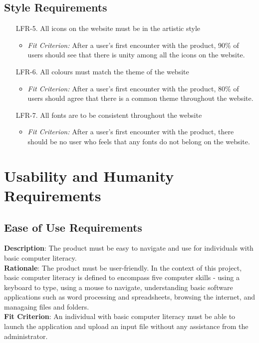 \documentclass[12pt]{article}
\begin{document}
\subsection{Style Requirements}
\begin{enumerate}
  \item [LFR-5.] All icons on the website must be in the artistic style
  \begin{itemize}
    \item \textit{Fit Criterion:} After a user's first encounter with the product, 90\% of users should
    see that there is unity among all the icons on the website. 
  \end{itemize}
  \item [LFR-6.] All colours must match the theme of the website
  \begin{itemize}
    \item \textit{Fit Criterion:} After a user's first encounter with the product, 80\% of users
    should agree that there is a common theme throughout the website.
  \end{itemize}
  \item [LFR-7.] All fonts are to be consistent throughout the website 
  \begin{itemize}
    \item \textit{Fit Criterion:} After a user's first encounter with the product, there should
    be no user who feels that any fonts do not belong on the website. 
  \end{itemize}
\end{enumerate}

\section{Usability and Humanity Requirements}
\subsection{Ease of Use Requirements}
\textbf{Description}: The product must be easy to navigate and use for
individuals with basic computer literacy.\\
\textbf{Rationale}: The product must be user-friendly. In the context of this
project, basic computer literacy is defined to encompass five computer skills -
using a keyboard to type, using a mouse to navigate, understanding basic
software applications such as word processing and spreadsheets, browsing the
internet, and managaing files and folders.\\ 
\textbf{Fit Criterion}: An individual with basic computer literacy must be able
to launch the application and upload an input file without any assistance from
the administrator.
\end{document}
